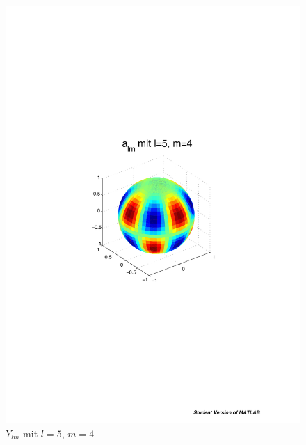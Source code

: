 \begin{refsection}
\begin{figure}
\begin{minipage}[hbt]{0.4\textwidth}
\includegraphics[width=1\textwidth]{kugel/ylm/a_5_4.pdf}
\caption{$Y_{lm}$ mit $l=5$, $m=4$}
\label{skript:ylm l=5 m=4}
\end{minipage}
\hfill
\begin{minipage}[hbt]{0.4\textwidth}
\centering

\end{minipage}
\end{figure}
\end{refsection}
